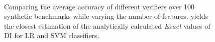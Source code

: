 \begin{figure}[t!]
	\begin{center}	
		\\
	\end{center}
	\caption{Comparing the average accuracy of different verifiers over 100 synthetic benchmarks while varying the number of features. {\fvgm} yields the closest estimation of the analytically calculated \textit{Exact} values of DI for LR and SVM classifiers.}\label{fvgm_fig:sanity_exp}
\end{figure}
